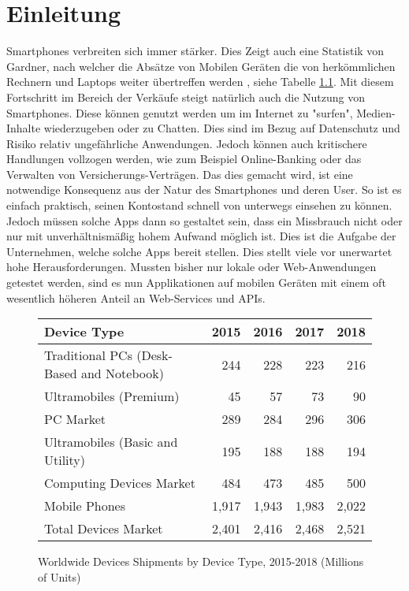 \chapter{Einleitung}
Smartphones verbreiten sich immer stärker. Dies Zeigt auch eine Statistik von Gardner, nach welcher die Absätze von Mobilen Geräten die von herkömmlichen Rechnern und Laptops weiter übertreffen werden \cite{GartnerSales}, siehe Tabelle \ref{ref:GartnerSalesTable}. Mit diesem Fortschritt im Bereich der Verkäufe steigt natürlich auch die Nutzung von Smartphones. Diese können genutzt werden um im Internet zu "surfen", Medien-Inhalte wiederzugeben oder zu Chatten. Dies sind im Bezug auf Datenschutz und Risiko relativ ungefährliche Anwendungen. Jedoch können auch kritischere Handlungen vollzogen werden, wie zum Beispiel Online-Banking oder das Verwalten von Versicherungs-Verträgen. Das dies gemacht wird, ist eine notwendige Konsequenz aus der Natur des Smartphones und deren User. So ist es einfach praktisch, seinen Kontostand schnell von unterwegs einsehen zu können. Jedoch müssen solche Apps dann so gestaltet sein, dass ein Missbrauch nicht oder nur mit unverhältnismäßig hohem Aufwand möglich ist. Dies ist die Aufgabe der Unternehmen, welche solche Apps bereit stellen. Dies stellt viele vor unerwartet hohe Herausforderungen. Mussten bisher nur lokale oder Web-Anwendungen getestet werden, sind es nun Applikationen auf mobilen Geräten mit einem oft wesentlich höheren Anteil an Web-Services und APIs.

\begin{figure}[htbp]
	\centering
	\begin{tabular}{ l r r r r}
		Device Type & 2015 & 2016 & 2017 & 2018 \\ \hline
		Traditional PCs (Desk-Based and Notebook) & 244 & 228 & 223 & 216 \\
		Ultramobiles (Premium) & 45 & 57 & 73 & 90 \\
		PC Market & 289 & 284 & 296 & 306 \\
		Ultramobiles (Basic and Utility) & 195 & 188 & 188 & 194 \\
		Computing Devices Market & 484 & 473 & 485 & 500 \\
		Mobile Phones & 1,917 & 1,943 & 1,983 & 2,022 \\
		Total Devices Market & 2,401 & 2,416 & 2,468 & 2,521 \\
	\end{tabular}
	\label{ref:GartnerSalesTable}
	\caption{Worldwide Devices Shipments by Device Type, 2015-2018 (Millions of Units)\cite{GartnerSales}}
\end{figure}

